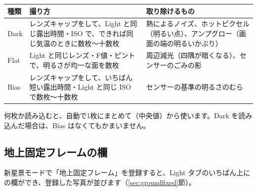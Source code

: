 \begin{center}
\small
\begin{tabularx}{\linewidth}{l X X}
\toprule
種類 & 撮り方 & 取り除けるもの \\
\midrule
Dark & レンズキャップをして、Light と同じ露出時間・ISO で、できれば同じ気温のときに数枚〜十数枚 & 熱によるノイズ、ホットピクセル（明るい点）、アンプグロー（画面の端の明るいかぶり） \\
Flat & Light と同じレンズ・F値・ピントで、明るさが均一な面を数枚 & 周辺減光（四隅が暗くなる）、センサーのごみの影 \\
Bias & レンズキャップをして、いちばん短い露出時間・Light と同じ ISO で数枚〜十数枚 & センサーの基準の明るさのむら \\
\bottomrule
\end{tabularx}
\end{center}

\begin{hint}
何枚か読み込むと、自動で1枚にまとめて（中央値）から使います。Dark を読み込んだ場合は、Bias はなくてもかまいません。
\end{hint}

\subsection{地上固定フレームの欄}

新星景モードで「地上固定フレーム」を登録すると、Light タブのいちばん上にの欄ができ、登録した写真が並びます（\ref{sec:groundfixed}節）。
